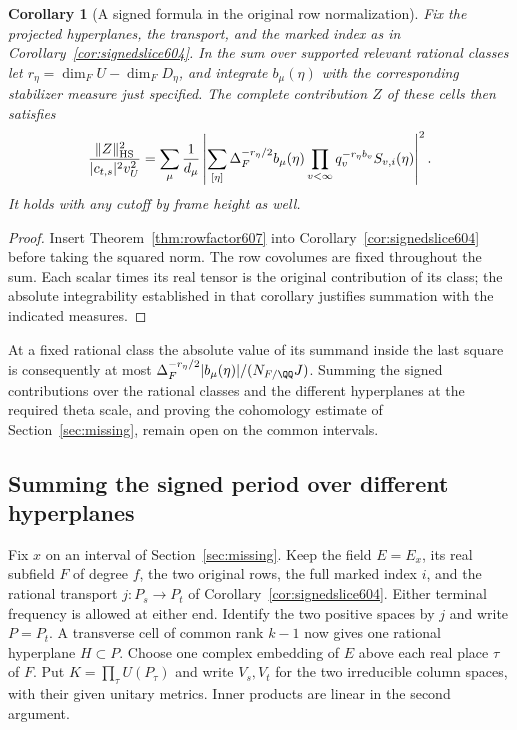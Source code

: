 \documentclass[a4paper,11pt]{article}
\newtheorem{corollary}[proposition]{Corollary}
\theoremstyle{definition}
\theoremstyle{remark}
\numberwithin{equation}{section}
\begin{document}
\begin{corollary}[A signed formula in the original row normalization]
\leavevmode\label{cor:rowperiod607}
Fix the projected hyperplanes, the transport, and the marked
index as in Corollary~\ref{cor:signedslice604}. In the sum over
supported relevant rational classes let \(r_\eta=\dim_F U-\dim_F
D_\eta\), and integrate \(b_\mu(\eta)\) with the corresponding
stabilizer measure just specified. The complete contribution \(Z\)
of these cells then satisfies
\[
 \frac{\|Z\|_{\rm HS}^2}{|c_{t,s}|^2v_U^2}
   =\sum_\mu\frac1{d_\mu}
       \left|\sum_{[\eta]}\Delta_F^{-r_\eta/2}
                  b_\mu(\eta)\prod_{v<\infty}
                          q_v^{-r_\eta b_v}S_{v,i}(\eta)\right|^2 .
\]
It holds with any cutoff by frame height as well.
\end{corollary}
\begin{proof}
Insert Theorem~\ref{thm:rowfactor607} into
Corollary~\ref{cor:signedslice604} before taking the squared
norm. The row covolumes are fixed throughout the sum.
Each scalar times its real tensor is the original contribution
of its class; the absolute integrability established in that
corollary justifies summation with the indicated measures.
\end{proof}

At a fixed rational class the absolute value of its summand
inside the last square is consequently at most
\(\Delta_F^{-r_\eta/2}|b_\mu(\eta)|/(N_{F/\QQ}J)\).
Summing the signed contributions over the rational classes
and the different hyperplanes at the required theta scale,
and proving the cohomology estimate of Section~\ref{sec:missing},
remain open on the common intervals.


\subsection{Summing the signed period over different hyperplanes}
\label{sec:hyperplanesum610}

Fix \(x\) on an interval of Section~\ref{sec:missing}. Keep the
field \(E=E_x\), its real subfield \(F\) of degree \(f\), the two
original rows, the full marked index \(i\), and the rational
transport \(j:P_s\to P_t\) of Corollary~\ref{cor:signedslice604}.
Either terminal frequency is allowed at either end. Identify the two
positive spaces by \(j\) and write \(P=P_t\). A transverse cell
of common rank \(k-1\) now gives one rational hyperplane \(H\subset P\).
Choose one complex embedding of \(E\) above each real place \(\tau\)
of \(F\). Put \(K=\prod_\tau U(P_\tau)\) and write \(V_s,V_t\)
for the two irreducible column spaces, with their given unitary
metrics. Inner products are linear in the second argument.
\end{document}

